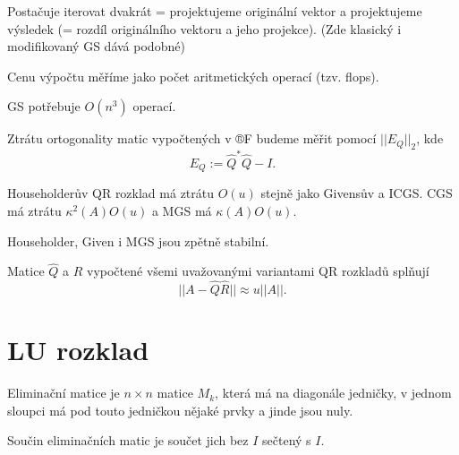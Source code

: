 \documentclass[12pt]{article}					%
\begin{document}
	\begin{definice}
		Postačuje iterovat dvakrát = projektujeme originální vektor a projektujeme výsledek (= rozdíl originálního vektoru a jeho projekce). (Zde klasický i modifikovaný GS dává podobné)
	\end{definice}

	\begin{definice}
		Cenu výpočtu měříme jako počet aritmetických operací (tzv. flops).
	\end{definice}

	\begin{poznamka}
		GS potřebuje $O(n^3)$ operací.
	\end{poznamka}

	\begin{definice}
		Ztrátu ortogonality matic vypočtených v ®F budeme měřit pomocí $||E_Q||_2$, kde
		$$ E_Q := \hat{Q}^*\hat{Q} - I. $$

		\begin{prikladyin}
			Householderův QR rozklad má ztrátu $O(u)$ stejně jako Givensův a ICGS. CGS má ztrátu $\kappa^2(A)O(u)$ a MGS má $\kappa(A) O(u)$.
		\end{prikladyin}
	\end{definice}

	\begin{poznamka}
		Householder, Given i MGS jsou zpětně stabilní.
	\end{poznamka}

	\begin{definice}
		Matice $\hat{Q}$ a $\hat{R}$ vypočtené všemi uvažovanými variantami QR rozkladů splňují
		$$ ||A - \hat{Q}\hat{R}|| \approx u||A||. $$
	\end{definice}


\section{LU rozklad}
\begin{definice}
	Eliminační matice je $n \times n$ matice $M_k$, která má na diagonále jedničky, v jednom sloupci má pod touto jedničkou nějaké prvky a jinde jsou nuly.

	\begin{poznamkain}
		Součin eliminačních matic je součet jich bez $I$ sečtený s $I$.
	\end{poznamkain}
\end{definice}
\end{document}
